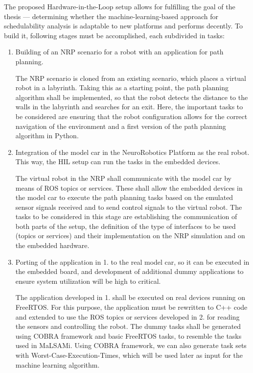 The proposed Hardware-in-the-Loop setup allows for fulfilling the goal of the thesis --- determining whether the machine-learning-based approach for schedulability analysis is adaptable to new platforms and performs decently. To build it, following stages must be accomplished, each subdivided in tasks:
\begin{enumerate}
\item	Building of an NRP scenario for a robot with an application for path planning.

The NRP scenario is cloned from an existing scenario, which places a virtual robot in a labyrinth. Taking this as a starting point, the path planning algorithm shall be implemented, so that the robot detects the distance to the walls in the labyrinth and searches for an exit. Here, the important tasks to be considered are ensuring that the robot configuration allows for the correct navigation of the environment and a first version of the path planning algorithm in Python.

\item	Integration of the model car in the NeuroRobotics Platform as the real robot. This way, the HIL setup can run the tasks in the embedded devices.

The virtual robot in the NRP shall communicate with the model car by means of ROS topics or services. These shall allow the embedded devices in the model car to execute the path planning tasks based on the emulated sensor signals received and to send control signals to the virtual robot. The tasks to be considered in this stage are establishing the communication of both parts of the setup, the definition of the type of interfaces to be used (topics or services) and their implementation on the NRP simulation and on the embedded hardware.

\item	Porting of the application in 1. to the real model car, so it can be executed in the embedded board, and development of additional dummy applications to ensure system utilization will be high to critical.

The application developed in 1. shall be executed on real devices running on FreeRTOS. For this purpose, the application must be rewritten to C++ code and extended to use the ROS topics or services developed in 2. for reading the sensors and controlling the robot. The dummy tasks shall be generated using COBRA framework and basic FreeRTOS tasks, to resemble the tasks used in MaLSAMi. Using COBRA framework, we can also generate task sets with Worst-Case-Execution-Times, which will be used later as input for the machine learning algorithm.


\end{enumerate}
